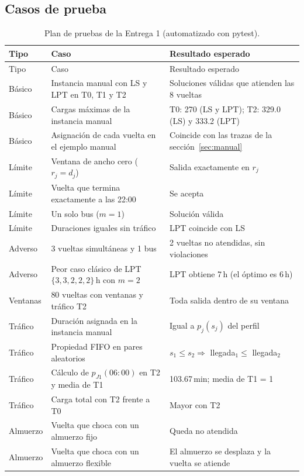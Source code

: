 \subsection{Casos de prueba}
{\small
\begin{longtable}{L{2.9cm}L{6.4cm}L{5.4cm}}
\caption{Plan de pruebas de la Entrega 1 (automatizado con pytest).}\label{tab:pruebas}\\
\toprule
Tipo & Caso & Resultado esperado \\
\midrule\endfirsthead
\toprule
Tipo & Caso & Resultado esperado \\
\midrule\endhead
\bottomrule\endfoot
Básico & Instancia manual con LS y LPT en T0, T1 y T2 & Soluciones válidas que atienden las 8 vueltas \\
Básico & Cargas máximas de la instancia manual & T0: 270 (LS y LPT); T2: 329.0 (LS) y 333.2 (LPT) \\
Básico & Asignación de cada vuelta en el ejemplo manual & Coincide con las trazas de la sección~\ref{sec:manual} \\
Límite & Ventana de ancho cero ($r_j = d_j$) & Salida exactamente en $r_j$ \\
Límite & Vuelta que termina exactamente a las 22:00 & Se acepta \\
Límite & Un solo bus ($m = 1$) & Solución válida \\
Límite & Duraciones iguales sin tráfico & LPT coincide con LS \\
Adverso & 3 vueltas simultáneas y 1 bus & 2 vueltas no atendidas, sin violaciones \\
Adverso & Peor caso clásico de LPT $\{3, 3, 2, 2, 2\}$\,h con $m = 2$ & LPT obtiene 7\,h (el óptimo es 6\,h) \\
Ventanas & 80 vueltas con ventanas y tráfico T2 & Toda salida dentro de su ventana \\
Tráfico & Duración asignada en la instancia manual & Igual a $p_j(s_j)$ del perfil \\
Tráfico & Propiedad FIFO en pares aleatorios & $s_1 \le s_2 \Rightarrow$ llegada$_1 \le$ llegada$_2$ \\
Tráfico & Cálculo de $p_{J1}(06{:}00)$ en T2 y media de T1 & 103.67\,min; media de T1 = 1 \\
Tráfico & Carga total con T2 frente a T0 & Mayor con T2 \\
Almuerzo & Vuelta que choca con un almuerzo fijo & Queda no atendida \\
Almuerzo & Vuelta que choca con un almuerzo flexible & El almuerzo se desplaza y la vuelta se atiende \\

\end{longtable}}
